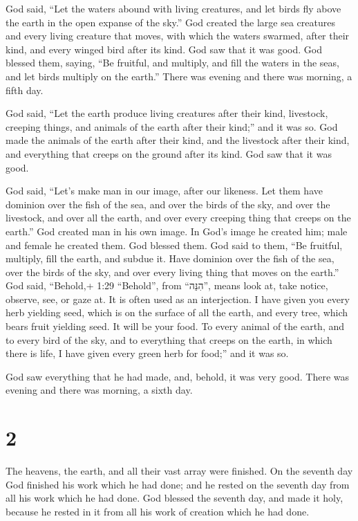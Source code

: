  God said, ``Let the waters abound with living creatures,
and let birds fly above the earth in the open expanse of the sky.''
 God created the large sea creatures and every living
creature that moves, with which the waters swarmed, after their kind,
and every winged bird after its kind. God saw that it was good.
 God blessed them, saying, ``Be fruitful, and multiply, and
fill the waters in the seas, and let birds multiply on the earth.''
 There was evening and there was morning, a fifth day.

 God said, ``Let the earth produce living creatures after
their kind, livestock, creeping things, and animals of the earth after
their kind;'' and it was so.  God made the animals of the
earth after their kind, and the livestock after their kind, and
everything that creeps on the ground after its kind. God saw that it was
good.

 God said, ``Let's make man in our image, after our
likeness. Let them have dominion over the fish of the sea, and over the
birds of the sky, and over the livestock, and over all the earth, and
over every creeping thing that creeps on the earth.''  God
created man in his own image. In God's image he created him; male and
female he created them.  God blessed them. God said to
them, ``Be fruitful, multiply, fill the earth, and subdue it. Have
dominion over the fish of the sea, over the birds of the sky, and over
every living thing that moves on the earth.''  God said,
``Behold,+ 1:29 ``Behold'', from ``הִנֵּה'', means look at, take notice,
observe, see, or gaze at. It is often used as an interjection. I have
given you every herb yielding seed, which is on the surface of all the
earth, and every tree, which bears fruit yielding seed. It will be your
food.  To every animal of the earth, and to every bird of
the sky, and to everything that creeps on the earth, in which there is
life, I have given every green herb for food;'' and it was so.

 God saw everything that he had made, and, behold, it was
very good. There was evening and there was morning, a sixth day.

\hypertarget{section-1}{%
\section{2}\label{section-1}}

 The heavens, the earth, and all their vast array were
finished.  On the seventh day God finished his work which he
had done; and he rested on the seventh day from all his work which he
had done.  God blessed the seventh day, and made it holy,
because he rested in it from all his work of creation which he had done.

